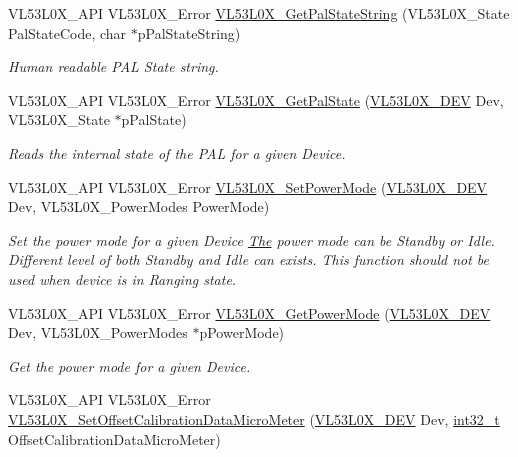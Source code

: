 \begin{DoxyCompactItemize}
V\+L53\+L0\+X\+\_\+\+A\+PI V\+L53\+L0\+X\+\_\+\+Error \hyperlink{group__VL53L0X__general__group_ga1897c54c56a85fab54012ea53a444b23}{V\+L53\+L0\+X\+\_\+\+Get\+Pal\+State\+String} (V\+L53\+L0\+X\+\_\+\+State Pal\+State\+Code, char $\ast$p\+Pal\+State\+String)
\begin{DoxyCompactList}\small\item\em Human readable P\+AL State string. \end{DoxyCompactList}\item 
V\+L53\+L0\+X\+\_\+\+A\+PI V\+L53\+L0\+X\+\_\+\+Error \hyperlink{group__VL53L0X__general__group_gac4b91d3adc134655064fcc2c4a9adf24}{V\+L53\+L0\+X\+\_\+\+Get\+Pal\+State} (\hyperlink{group__VL53L0X__platform__group_ga2d6405308b1dd524b462f1b8fb97d167}{V\+L53\+L0\+X\+\_\+\+D\+EV} Dev, V\+L53\+L0\+X\+\_\+\+State $\ast$p\+Pal\+State)
\begin{DoxyCompactList}\small\item\em Reads the internal state of the P\+AL for a given Device. \end{DoxyCompactList}\item 
V\+L53\+L0\+X\+\_\+\+A\+PI V\+L53\+L0\+X\+\_\+\+Error \hyperlink{group__VL53L0X__general__group_ga8b435ab0813267fca1546c7da732c1f2}{V\+L53\+L0\+X\+\_\+\+Set\+Power\+Mode} (\hyperlink{group__VL53L0X__platform__group_ga2d6405308b1dd524b462f1b8fb97d167}{V\+L53\+L0\+X\+\_\+\+D\+EV} Dev, V\+L53\+L0\+X\+\_\+\+Power\+Modes Power\+Mode)
\begin{DoxyCompactList}\small\item\em Set the power mode for a given Device \hyperlink{structThe}{The} power mode can be Standby or Idle. Different level of both Standby and Idle can exists. This function should not be used when device is in Ranging state. \end{DoxyCompactList}\item 
V\+L53\+L0\+X\+\_\+\+A\+PI V\+L53\+L0\+X\+\_\+\+Error \hyperlink{group__VL53L0X__general__group_ga53faed55c6951878c58b6a19d613ee9b}{V\+L53\+L0\+X\+\_\+\+Get\+Power\+Mode} (\hyperlink{group__VL53L0X__platform__group_ga2d6405308b1dd524b462f1b8fb97d167}{V\+L53\+L0\+X\+\_\+\+D\+EV} Dev, V\+L53\+L0\+X\+\_\+\+Power\+Modes $\ast$p\+Power\+Mode)
\begin{DoxyCompactList}\small\item\em Get the power mode for a given Device. \end{DoxyCompactList}\item 
V\+L53\+L0\+X\+\_\+\+A\+PI V\+L53\+L0\+X\+\_\+\+Error \hyperlink{group__VL53L0X__general__group_ga6d87e7c39e30ede9f158362624487718}{V\+L53\+L0\+X\+\_\+\+Set\+Offset\+Calibration\+Data\+Micro\+Meter} (\hyperlink{group__VL53L0X__platform__group_ga2d6405308b1dd524b462f1b8fb97d167}{V\+L53\+L0\+X\+\_\+\+D\+EV} Dev, \hyperlink{vl53l0x__types_8h_a32f2e37ee053cf2ce8ca28d1f74630e5}{int32\+\_\+t} Offset\+Calibration\+Data\+Micro\+Meter)

\end{DoxyCompactItemize}
